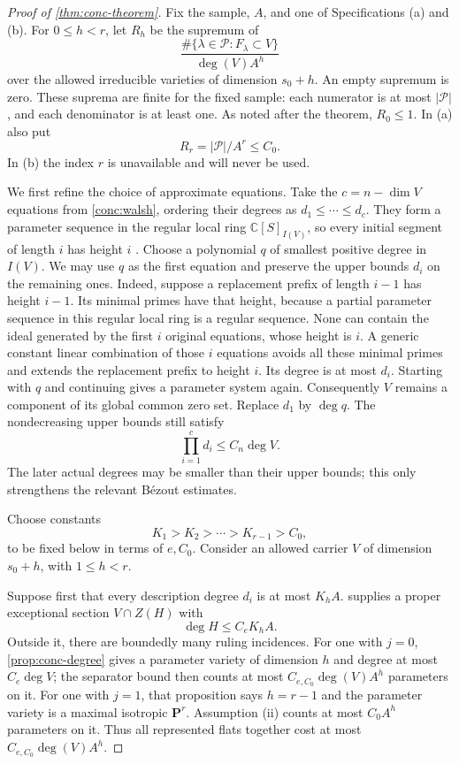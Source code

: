 \begin{proof}[Proof of \cref{thm:conc-theorem}]
Fix the sample, $A$, and one of Specifications (a) and (b).  For $0\leq h<r$, let $R_h$ be the supremum of
\[
 \frac{\#\{\lambda\in\mathcal{P}:F_\lambda\subset V\}}
      {\deg(V)A^h}
\]
over the allowed irreducible varieties of dimension $s_0+h$. An empty supremum is zero.  These suprema are finite for the fixed sample: each numerator is at most $|\mathcal{P}|$, and each denominator is at least one.  As noted after the theorem, $R_0\leq1$.  In (a) also put
\[
 R_r=|\mathcal{P}|/A^r\leq C_0.
\]
In (b) the index $r$ is unavailable and will never be used.

We first refine the choice of approximate equations.  Take the $c=n-\dim V$ equations from \cref{conc:walsh}, ordering their degrees as $d_1\leq\cdots\leq d_c$.  They form a parameter sequence in the regular local ring $\mathbb{C}[S]_{I(V)}$, so every initial segment of length $i$ has height $i$ \mbox{\cite[Tags~00NQ, 02JN, and 00NA]{stacksproject}}.  Choose a polynomial $q$ of smallest positive degree in $I(V)$.  We may use $q$ as the first equation and preserve the upper bounds $d_i$ on the remaining ones. Indeed, suppose a replacement prefix of length $i-1$ has height $i-1$.  Its minimal primes have that height, because a partial parameter sequence in this regular local ring is a regular sequence. None can contain the ideal generated by the first $i$ original equations, whose height is $i$.  A generic constant linear combination of those $i$ equations avoids all these minimal primes and extends the replacement prefix to height $i$.  Its degree is at most $d_i$. Starting with $q$ and continuing gives a parameter system again. Consequently $V$ remains a component of its global common zero set. Replace $d_1$ by $\deg q$.  The nondecreasing upper bounds still satisfy
\begin{equation}
 \prod_{i=1}^c d_i\leq C_n\deg V.
 \label{eq:conc-description-product}
\end{equation}
The later actual degrees may be smaller than their upper bounds; this only strengthens the relevant B\'ezout estimates.

Choose constants
\[
 K_1>K_2>\cdots>K_{r-1}>C_0,
\]
to be fixed below in terms of $e,C_0$.  Consider an allowed carrier $V$ of dimension $s_0+h$, with $1\leq h<r$.

Suppose first that every description degree $d_i$ is at most $K_hA$.  supplies a proper exceptional section $V\cap Z(H)$ with
\[
 \deg H\leq C_eK_hA.
\]
Outside it, there are boundedly many ruling incidences.  For one with $j=0$, \cref{prop:conc-degree} gives a parameter variety of dimension $h$ and degree at most $C_e\deg V$; the separator bound then counts at most $C_{e,C_0}\deg(V)A^h$ parameters on it.  For one with $j=1$, that proposition says $h=r-1$ and the parameter variety is a maximal isotropic $\mathbf{P}^r$.  Assumption (ii) counts at most $C_0A^h$ parameters on it.  Thus all represented flats together cost at most $C_{e,C_0}\deg(V)A^h$.


\end{proof}
